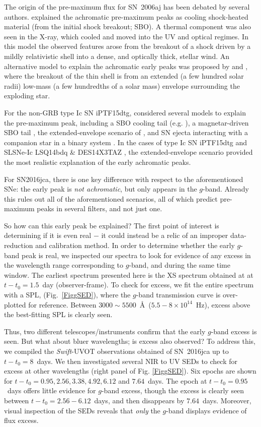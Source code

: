 \documentclass[traditabstract,longauth]{aa}
\begin{document}
The origin of the pre-maximum flux for SN~2006aj has been debated by several authors.  \citet{Campana06} explained the achromatic pre-maximum peaks as cooling shock-heated material (from the initial shock breakout; SBO).  A thermal component was also seen in the X-ray, which cooled and moved into the UV and optical regimes. In this model the observed features arose from the breakout of a shock driven by a mildly relativistic shell into a dense, and optically thick, stellar wind.  An alternative model to explain the achromatic early peaks was proposed by \citet{Margutti15} and \citet{Nakar15}, where the breakout of the thin shell is from an extended (a few hundred solar radii) low-mass (a few hundredths of a solar mass) envelope surrounding the exploding star.

For the non-GRB type Ic SN iPTF15dtg, \citet{Taddia16} considered several models to explain the pre-maximum peak, including a SBO cooling tail (e.g. \citealt{PiroNakar13}), a magnetar-driven SBO tail \citep{Kasen16}, the extended-envelope scenario of \citet{Nakar15}, and SN ejecta interacting with a companion star in a binary system \citep{Kasen10}.  In the cases of type Ic SN iPTF15dtg and SLSNe-Ic LSQ14bdq \citep{Nicholl15} \& DES14X3TAZ \citep{Smith16}, the extended-envelope scenario provided the most realistic explanation of the early achromatic peaks.

For SN2016jca, there is one key difference with respect to the aforementioned SNe: the early peak is \emph{not achromatic}, but only appears in the $g$-band.  Already this rules out all of the aforementioned scenarios, all of which predict pre-maximum peaks in several filters, and not just one.

So how can this early peak be explained?  The first point of interest is determining if it is even real $-$ it could instead be a relic of an improper data-reduction and calibration method.  In order to determine whether the early $g$-band peak is real, we inspected our spectra to look for evidence of any excess in the wavelength range corresponding to $g$-band, and during the same time window.  The earliest spectrum presented here is the XS spectrum obtained at at $t-t_0=1.5$~day (observer-frame).  To check for excess, we fit the entire spectrum with a SPL, (Fig.~\ref{FiggSED}), where the $g$-band transmission curve is over-plotted for reference.  Between $3000\sim5500$~\AA~($5.5-8\times10^{14}$~Hz), excess above the best-fitting SPL is clearly seen.  


Thus, two different telescopes/instruments confirm that the early $g$-band excess is seen.  But what about bluer wavelengths; is excess also observed?  To address this, we compiled the \emph{Swift}-UVOT observations obtained of SN~2016jca up to $t-t_0=8$~days.  We then investigated several NIR to UV SEDs to check for excess at other wavelengths (right panel of Fig. \ref{FiggSED}).  Six epochs are shown for $t-t_0 = 0.95, 2.56, 3.38, 4.92, 6.12$ and $7.64$~days.  The epoch at $t-t_0 = 0.95$~days offers little evidence for $g$-band excess, though the excess is clearly seen between $t-t_0 = 2.56-6.12$~days, and then disappears by $7.64$~days.  Moreover, visual inspection of the SEDs reveals that \emph{only} the $g$-band displays evidence of flux excess.
\end{document}
